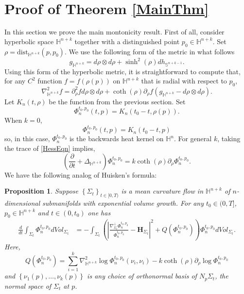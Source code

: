 \documentclass{amsart}
\newtheorem{prop}[thm]{Proposition}
\theoremstyle{definition}
\theoremstyle{remark}
\numberwithin{equation}{section}
\newcommand{\set}[1]{\left\{#1\right\}}
\newcommand{\dist}[0]{\mathrm{dist}}
\begin{document}
\section{Proof of Theorem \ref{MainThm}}
In this section we prove the main montonicity result.
First of all, consider hyperbolic space $\mathbb{H}^{n+k}$ together with a distinguished point $p_0\in \mathbb{H}^{n+k}$.  Set $\rho=\dist_{\mathbb{H}^{n+k}}(p,p_0)$.   We use the following form of the metric in what follows
$$
g_{\mathbb{H}^{n+k}}=d\rho\otimes d\rho +\sinh^2(\rho) dh_{\mathbb{S}^{n+k-1}}.
$$
Using this form of the hyperbolic metric, it is straightforward to compute that, for any $C^2$ function $f=f(\rho(p))$ on $\mathbb{H}^{n+k}$ that is radial with respect to $p_0$,
\begin{equation}
\label{HessEqn}
\nabla^2_{\mathbb{H}^{n+k}} f=\partial^2_\rho f d\rho \otimes d\rho + \coth(\rho) \partial_\rho f  (g_{\mathbb{H}^{n+k}} -d\rho\otimes d\rho).
\end{equation}
Let $K_n(t,\rho)$ be the function from the previous section.  Set 
$$
\Phi_n^{t_0, p_0}(t,p)=K_n(t_0-t, \rho(p)).
$$
When $k=0$,
$$
\Phi_n^{t_0, p_0}(t,p)=K_n(t_0-t,p)
$$
so,  in this case,  $\Phi_n^{t_0, p_0}$ is the backwards heat kernel on $\mathbb{H}^n$.
For general $k$, taking the trace of \eqref{HessEqn} implies,
$$
\left(\frac{\partial}{\partial t} +\Delta_{\mathbb{H}^{n+k}}\right) \Phi_n^{t_0, p_0}=k \coth(\rho) \partial_\rho \Phi_n^{t_0, p_0}.
$$
We have the following analog of Huisken's formula:
\begin{prop}\label{MonotonicityFormulaProp}
Suppose $\set{\Sigma_t}_{t\in [0,T)}$ is a mean curvature flow in $\mathbb{H}^{n+k}$ of $n$-dimensional submanifolds with exponential volume growth. For any $t_0\in (0,T]$, $p_0\in \mathbb{H}^{n+k}$ and $t\in (0,t_0)$ one has
\begin{align*}
\frac{d}{dt} \int_{\Sigma_t} \Phi_n^{t_0,p_0} dVol_{\Sigma_t} &=- \int_{\Sigma_t}\left( \left| \frac{\nabla^\perp_{\Sigma_t} \Phi_n^{t_0,p_0}}{\Phi_n^{t_0,p_0}} -\mathbf{H}_{\Sigma_t}\right|^2 +Q(\Phi_n^{t_0,p_0}) \right) \Phi_n^{t_0,p_0} dVol_{\Sigma_t}.
\end{align*}
Here,
$$
Q(\Phi_n^{t_0,p_0})=\sum_{i=1}^{k}\nabla^2_{\mathbb{H}^{n+k}}\log \Phi_n^{t_0, p_0} (\nu_i, \nu_i) - k \coth(\rho) \partial_\rho \log \Phi_n^{t_0, p_0}
$$
and $\set{\nu_1(p), \ldots, \nu_{k}(p)}$ is any choice of orthonormal basis of $N_p\Sigma_t$, the normal space of $\Sigma_t$ at $p$.  
\end{prop}
\end{document}
